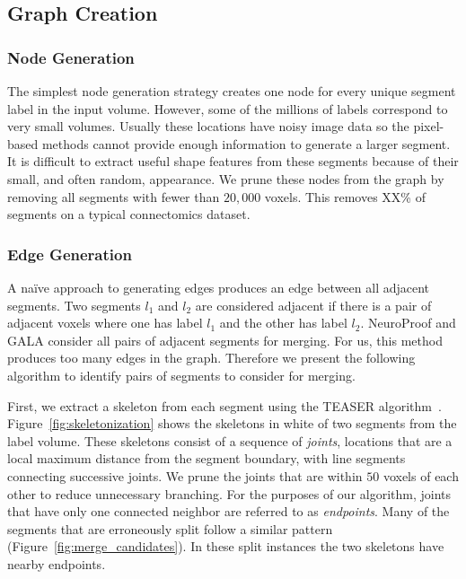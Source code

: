 \subsection{Graph Creation}
\label{sec:skeletonization}
\subsubsection{Node Generation}

The simplest node generation strategy creates one node for every unique segment label in the input volume.
However, some of the millions of labels correspond to very small volumes. 
Usually these locations have noisy image data so the pixel-based methods cannot provide enough information to generate a larger segment.
It is difficult to extract useful shape features from these segments because of their small, and often random, appearance. 
We prune these nodes from the graph by removing all segments with fewer than $20,000$ voxels. 
This removes XX\% of segments on a typical connectomics dataset. 

\subsubsection{Edge Generation}

A na\"ive approach to generating edges produces an edge between all adjacent segments.
Two segments $l_1$ and $l_2$ are considered adjacent if there is a pair of adjacent voxels where one has label $l_1$ and the other has label $l_2$. 
NeuroProof and GALA consider all pairs of adjacent segments for merging. 
For us, this method produces too many edges in the graph. 
Therefore we present the following algorithm to identify pairs of segments to consider for merging. 

First, we extract a skeleton from each segment using the TEASER algorithm~\cite{sato2000teasar,zhao2014automatic}.
Figure~\ref{fig:skeletonization} shows the skeletons in white of two segments from the label volume.
These skeletons consist of a sequence of \textit{joints}, locations that are a local maximum distance from the segment boundary, with line segments connecting successive joints. 
We prune the joints that are within $50$ voxels of each other to reduce unnecessary branching.
For the purposes of our algorithm, joints that have only one connected neighbor are referred to as \textit{endpoints}. 
Many of the segments that are erroneously split follow a similar pattern (Figure~\ref{fig:merge_candidates}). 
In these split instances the two skeletons have nearby endpoints.

